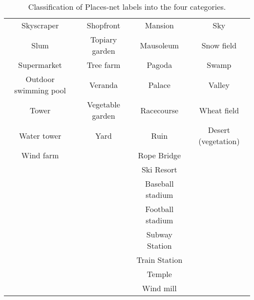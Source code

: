 \begin{table}[htb!]
\begin{tabular}{ |c|c|c|c| }
        Skyscraper & Shopfront & Mansion & Sky \\
        Slum & Topiary garden & Mausoleum & Snow field \\
        Supermarket & Tree farm & Pagoda & Swamp \\
        Outdoor swimming pool & Veranda & Palace & Valley \\
        Tower & Vegetable garden  & Racecourse & Wheat field \\
        Water tower & Yard & Ruin & Desert (vegetation) \\
        Wind farm &  & Rope Bridge & \\
         &  & Ski Resort & \\
         &  & Baseball stadium & \\
         &  & Football stadium & \\
         &  & Subway Station & \\
         &  & Train Station & \\
         &  & Temple & \\
         &  & Wind mill & \\
        \hline
    \end{tabular}
    \caption{Classification of Places-net labels into the four categories.}
    \label{tab:PlacesLabels}
\end{table}